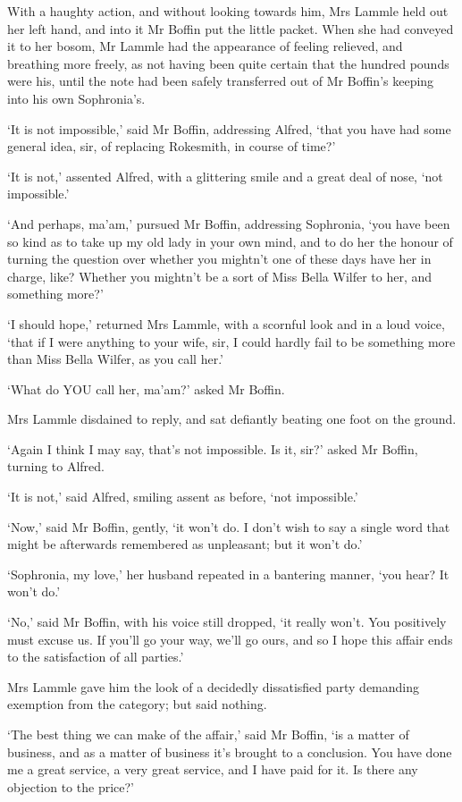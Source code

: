 With a haughty action, and without looking towards him, Mrs Lammle held
out her left hand, and into it Mr Boffin put the little packet. When she
had conveyed it to her bosom, Mr Lammle had the appearance of feeling
relieved, and breathing more freely, as not having been quite certain
that the hundred pounds were his, until the note had been safely
transferred out of Mr Boffin’s keeping into his own Sophronia’s.

‘It is not impossible,’ said Mr Boffin, addressing Alfred, ‘that you
have had some general idea, sir, of replacing Rokesmith, in course of
time?’

‘It is not,’ assented Alfred, with a glittering smile and a great deal
of nose, ‘not impossible.’

‘And perhaps, ma’am,’ pursued Mr Boffin, addressing Sophronia, ‘you have
been so kind as to take up my old lady in your own mind, and to do her
the honour of turning the question over whether you mightn’t one of
these days have her in charge, like? Whether you mightn’t be a sort of
Miss Bella Wilfer to her, and something more?’

‘I should hope,’ returned Mrs Lammle, with a scornful look and in a loud
voice, ‘that if I were anything to your wife, sir, I could hardly fail
to be something more than Miss Bella Wilfer, as you call her.’

‘What do YOU call her, ma’am?’ asked Mr Boffin.

Mrs Lammle disdained to reply, and sat defiantly beating one foot on the
ground.

‘Again I think I may say, that’s not impossible. Is it, sir?’ asked Mr
Boffin, turning to Alfred.

‘It is not,’ said Alfred, smiling assent as before, ‘not impossible.’

‘Now,’ said Mr Boffin, gently, ‘it won’t do. I don’t wish to say a
single word that might be afterwards remembered as unpleasant; but it
won’t do.’

‘Sophronia, my love,’ her husband repeated in a bantering manner, ‘you
hear? It won’t do.’

‘No,’ said Mr Boffin, with his voice still dropped, ‘it really won’t.
You positively must excuse us. If you’ll go your way, we’ll go ours, and
so I hope this affair ends to the satisfaction of all parties.’

Mrs Lammle gave him the look of a decidedly dissatisfied party demanding
exemption from the category; but said nothing.

‘The best thing we can make of the affair,’ said Mr Boffin, ‘is a matter
of business, and as a matter of business it’s brought to a conclusion.
You have done me a great service, a very great service, and I have paid
for it. Is there any objection to the price?’

